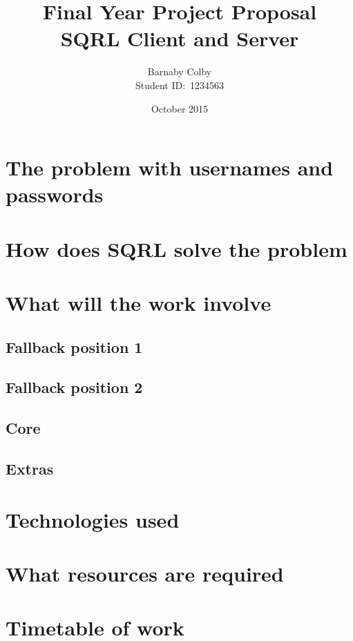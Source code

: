 \documentclass[a4paper]{article}
\begin{document}
\title{Final Year Project Proposal\\SQRL Client and Server}
\author{Barnaby Colby\\
Student ID:\ 1234563}
\date{October 2015}
\maketitle



\section*{The problem with usernames and passwords} 
\section*{How does SQRL solve the problem} 
\section*{What will the work involve} 
    \subsection*{Fallback position 1} 
    \subsection*{Fallback position 2} 
    \subsection*{Core} 
    \subsection*{Extras} 
\section*{Technologies used}
\section*{What resources are required}
\section*{Timetable of work}
\end{document}
